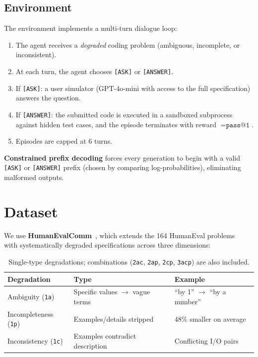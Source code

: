 \documentclass[11pt]{article}
\begin{document}
\subsection{Environment}

The environment implements a multi-turn dialogue loop:
\begin{enumerate}[nosep]
  \item The agent receives a \emph{degraded} coding problem (ambiguous, incomplete, or inconsistent).
  \item At each turn, the agent chooses \texttt{[ASK]} or \texttt{[ANSWER]}.
  \item If \texttt{[ASK]}: a user simulator (GPT-4o-mini with access to the full specification) answers the question.
  \item If \texttt{[ANSWER]}: the submitted code is executed in a sandboxed subprocess against hidden test cases, and the episode terminates with reward $= \texttt{pass@1}$.
  \item Episodes are capped at 6 turns.
\end{enumerate}

\textbf{Constrained prefix decoding} forces every generation to begin with a valid \texttt{[ASK]} or \texttt{[ANSWER]} prefix (chosen by comparing log-probabilities), eliminating malformed outputs.

\section{Dataset}

We use \textbf{HumanEvalComm}~\citep{zheng2024humanevalcomm}, which extends the 164 HumanEval problems~\citep{chen2021codex} with systematically degraded specifications across three dimensions:

\begin{table}[h]
\centering
\small
\begin{tabular}{@{}lll@{}}
\toprule
\textbf{Degradation} & \textbf{Type} & \textbf{Example} \\
\midrule
Ambiguity (\texttt{1a}) & Specific values $\to$ vague terms & ``by 1'' $\to$ ``by a number'' \\
Incompleteness (\texttt{1p}) & Examples/details stripped & 48\% smaller on average \\
Inconsistency (\texttt{1c}) & Examples contradict description & Conflicting I/O pairs \\
\bottomrule
\end{tabular}
\caption{Single-type degradations; combinations (\texttt{2ac}, \texttt{2ap}, \texttt{2cp}, \texttt{3acp}) are also included.}
\label{tab:degradation}
\end{table}
\end{document}
